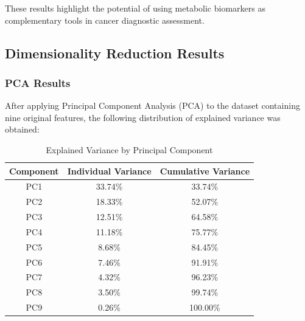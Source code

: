 \documentclass[12pt,a4paper]{article}
\begin{document}
These results highlight the potential of using metabolic biomarkers as complementary tools in cancer diagnostic assessment.


\subsection{Dimensionality Reduction Results}

\subsubsection{PCA Results}
\label{subsec:pca_results}


After applying Principal Component Analysis (PCA) to the dataset containing nine original features, the following distribution of explained variance was obtained:
  
\begin{table}[H]
\centering
\begin{tabular}{ccc}
\toprule
\textbf{Component} & \textbf{Individual Variance} & \textbf{Cumulative Variance} \\
\midrule
PC1 & 33.74\% & 33.74\% \\
PC2 & 18.33\% & 52.07\% \\
PC3 & 12.51\% & 64.58\% \\
PC4 & 11.18\% & 75.77\% \\
PC5 & 8.68\% & 84.45\% \\
PC6 & 7.46\% & 91.91\% \\
PC7 & 4.32\% & 96.23\% \\
PC8 & 3.50\% & 99.74\% \\
PC9 & 0.26\% & 100.00\% \\
\bottomrule
\end{tabular}
\caption{Explained Variance by Principal Component}
\end{table}
\end{document}
